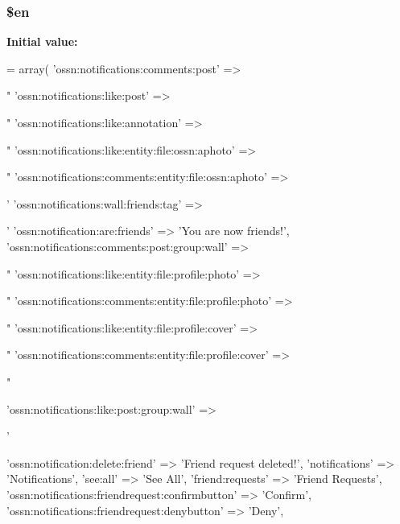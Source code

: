 \subsubsection[{\texorpdfstring{\$en}{$en}}]{\setlength{\rightskip}{0pt plus 5cm}\$en}\hypertarget{components_2_ossn_notifications_2locale_2ossn_8en_8php_a48abc714dfb71c8fffa83cf49f452115}{}\label{components_2_ossn_notifications_2locale_2ossn_8en_8php_a48abc714dfb71c8fffa83cf49f452115}
{\bfseries Initial value\+:}
\begin{DoxyCode}
= array(
    \textcolor{stringliteral}{'ossn:notifications:comments:post'} => \textcolor{stringliteral}{"%
    \textcolor{stringliteral}{'ossn:notifications:like:post'} => \textcolor{stringliteral}{"%
    \textcolor{stringliteral}{'ossn:notifications:like:annotation'} => \textcolor{stringliteral}{"%
    \textcolor{stringliteral}{'ossn:notifications:like:entity:file:ossn:aphoto'} => \textcolor{stringliteral}{"%
    \textcolor{stringliteral}{'ossn:notifications:comments:entity:file:ossn:aphoto'} => \textcolor{stringliteral}{'%
    \textcolor{stringliteral}{'ossn:notifications:wall:friends:tag'} => \textcolor{stringliteral}{'%
    \textcolor{stringliteral}{'ossn:notification:are:friends'} => \textcolor{stringliteral}{'You are now friends!'},
    \textcolor{stringliteral}{'ossn:notifications:comments:post:group:wall'} => \textcolor{stringliteral}{"%
    \textcolor{stringliteral}{'ossn:notifications:like:entity:file:profile:photo'} => \textcolor{stringliteral}{"%
    \textcolor{stringliteral}{'ossn:notifications:comments:entity:file:profile:photo'} => \textcolor{stringliteral}{"%
    \textcolor{stringliteral}{'ossn:notifications:like:entity:file:profile:cover'} => \textcolor{stringliteral}{"%
    \textcolor{stringliteral}{'ossn:notifications:comments:entity:file:profile:cover'} => \textcolor{stringliteral}{"%

    \textcolor{stringliteral}{'ossn:notifications:like:post:group:wall'} => \textcolor{stringliteral}{'%
    
    \textcolor{stringliteral}{'ossn:notification:delete:friend'} => \textcolor{stringliteral}{'Friend request deleted!'},
    \textcolor{stringliteral}{'notifications'} => \textcolor{stringliteral}{'Notifications'},
    \textcolor{stringliteral}{'see:all'} => \textcolor{stringliteral}{'See All'},
    \textcolor{stringliteral}{'friend:requests'} => \textcolor{stringliteral}{'Friend Requests'},
    \textcolor{stringliteral}{'ossn:notifications:friendrequest:confirmbutton'} => \textcolor{stringliteral}{'Confirm'},
    \textcolor{stringliteral}{'ossn:notifications:friendrequest:denybutton'} => \textcolor{stringliteral}{'Deny'},
    
}}}}}}}}}}}}
\end{DoxyCode}
